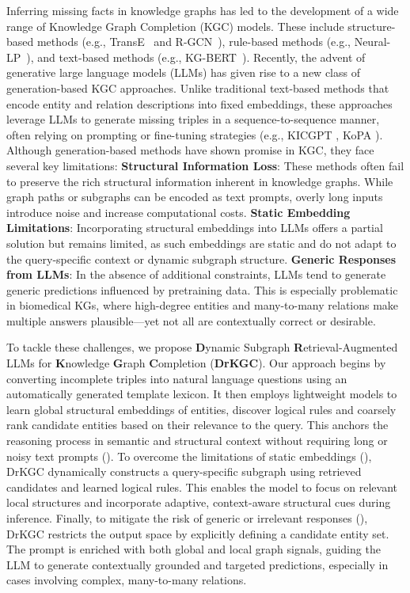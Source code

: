 \documentclass[11pt]{article}
\begin{document}
Inferring missing facts in knowledge graphs has led to the development of a wide range of Knowledge Graph Completion (KGC) models. These include structure-based methods (e.g., TransE~\citep{bordes2013translating} and R-GCN~\citep{schlichtkrull2018modeling}), rule-based methods (e.g., Neural-LP~\citep{yang2017differentiable}), and text-based methods (e.g., KG-BERT~\citep{yao2019kg}).
Recently, the advent of generative large language models (LLMs) has given rise to a new class of generation-based KGC approaches. Unlike traditional text-based methods that encode entity and relation descriptions into fixed embeddings, these approaches leverage LLMs to generate missing triples in a sequence-to-sequence manner, often relying on prompting or fine-tuning strategies (e.g., KICGPT \citep{wei2024kicgpt}, KoPA \citep{zhang2024making}). Although generation-based methods have shown promise in KGC, they face several key limitations:  \textbf{Structural Information Loss}: These methods often fail to preserve the rich structural information inherent in knowledge graphs. While graph paths or subgraphs can be encoded as text prompts, overly long inputs introduce noise and increase computational costs.  \textbf{Static Embedding Limitations}: Incorporating structural embeddings into LLMs offers a partial solution but remains limited, as such embeddings are static and do not adapt to the query-specific context or dynamic subgraph structure.  \textbf{Generic Responses from LLMs}: In the absence of additional constraints, LLMs tend to generate generic predictions influenced by pretraining data. This is especially problematic in biomedical KGs, where high-degree entities and many-to-many relations make multiple answers plausible—yet not all are contextually correct or desirable.
 
To tackle these challenges, we propose \textbf{D}ynamic Subgraph \textbf{R}etrieval-Augmented LLMs for \textbf{K}nowledge \textbf{G}raph \textbf{C}ompletion (\textbf{DrKGC}). Our approach begins by converting incomplete triples into natural language questions using an automatically generated template lexicon. It then employs lightweight models to learn global structural embeddings of entities, discover logical rules and coarsely rank candidate entities based on their relevance to the query. This anchors the reasoning process in semantic and structural context without requiring long or noisy text prompts ().
To overcome the limitations of static embeddings (), DrKGC dynamically constructs a query-specific subgraph using retrieved candidates and learned logical rules. This enables the model to focus on relevant local structures and incorporate adaptive, context-aware structural cues during inference.
Finally, to mitigate the risk of generic or irrelevant responses (), DrKGC restricts the output space by explicitly defining a candidate entity set. The prompt is enriched with both global and local graph signals, guiding the LLM to generate contextually grounded and targeted predictions, especially in cases involving complex, many-to-many relations.
 
\end{document}
